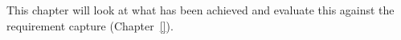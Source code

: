 This chapter will look at what has been achieved and evaluate this against the requirement capture (Chapter~\ref{}). 






